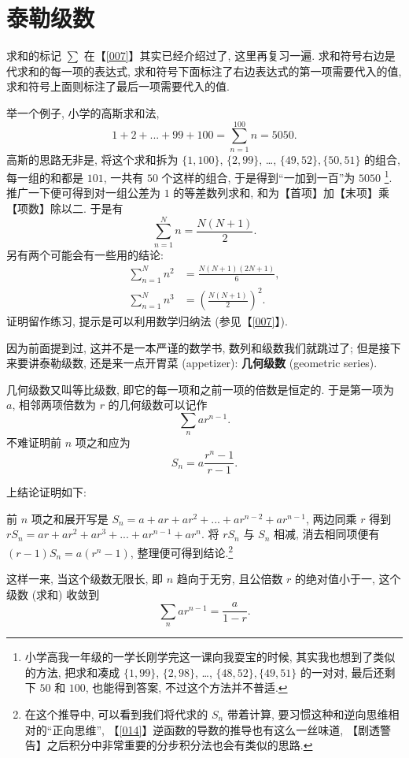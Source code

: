 \section{泰勒级数}\label{016}

\begin{tcolorbox}[size=fbox, breakable, enhanced jigsaw, title={求和 (summation) - 复习}]

求和的标记 $\sum$ 在【\ref{007}】其实已经介绍过了, 这里再复习一遍.
求和符号右边是代求和的每一项的表达式,
求和符号下面标注了右边表达式的第一项需要代入的值,
求和符号上面则标注了最后一项需要代入的值.

\begin{newquote}
举一个例子, 小学的高斯求和法,
\[
1+2+...+99+100=\sum_{n=1}^{100}n=5050.    
\]
高斯的思路无非是, 将这个求和拆为 $\{1,100\}$, $\{2,99\}$, \ldots,
$\{49,52\}$$, \{50,51\}$ 的组合, 每一组的和都是 $101$, 一共有
$50$ 个这样的组合, 于是得到``一加到一百''为 $5050$ \footnote{小学高我一年级的一学长刚学完这一课向我耍宝的时候,
  其实我也想到了类似的方法, 把求和凑成 $\{1,99\}$, $\{2,98\}$,
  \ldots, $\{48,52\}$$, \{49,51\}$ 的一对对, 最后还剩下 $50$ 和
  $100$, 也能得到答案, 不过这个方法并不普适.}.
推广一下便可得到对一组公差为 $1$ 的等差数列求和,
和为【首项】加【末项】乘【项数】除以二. 于是有 \[
\sum_{n=1}^Nn=\frac{N(N+1)}{2}.
\] 另有两个可能会有一些用的结论: \[
\begin{aligned}
  \sum_{n=1}^Nn^2&=\frac{N(N+1)(2N+1)}{6},\\
  \sum_{n=1}^Nn^3&=\left(\frac{N(N+1)}{2}\right)^2.
\end{aligned}
\] 证明留作练习, 提示是可以利用数学归纳法 (参见【\ref{007}】).
\end{newquote}

因为前面提到过, 这并不是一本严谨的数学书, 数列和级数我们就跳过了;
但是接下来要讲泰勒级数, 还是来一点开胃菜 (appetizer): \textbf{几何级数}
(geometric series).

几何级数又叫等比级数, 即它的每一项和之前一项的倍数是恒定的. 于是第一项为
$a$, 相邻两项倍数为 $r$ 的几何级数可以记作 \[
\sum_nar^{n-1}.
\] 不难证明前 $n$ 项之和应为 \[
S_n=a\frac{r^n-1}{r-1}.
\]

\begin{newquote}
上结论证明如下:

前 $n$ 项之和展开写是 $S_n=a+ar+ar^2+...+ar^{n-2}+ar^{n-1}$,
两边同乘 $r$ 得到 $rS_n=ar+ar^2+ar^3+...+ar^{n-1}+ar^n$. 将 $rS_n$
与 $S_n$ 相减, 消去相同项便有 $(r-1)S_n=a(r^n-1)$,
整理便可得到结论.\footnote{在这个推导中, 可以看到我们将代求的 $S_n$
  带着计算, 要习惯这种和逆向思维相对的``正向思维'',
  【\ref{014}】逆函数的导数的推导也有这么一丝味道,
  【剧透警告】之后积分中非常重要的分步积分法也会有类似的思路.}
\end{newquote}

这样一来, 当这个级数无限长, 即 $n$ 趋向于无穷, 且公倍数 $r$
的绝对值小于一, 这个级数 (求和) 收敛到 \[
\sum_nar^{n-1}=\frac{a}{1-r}.
\]

\end{tcolorbox}

